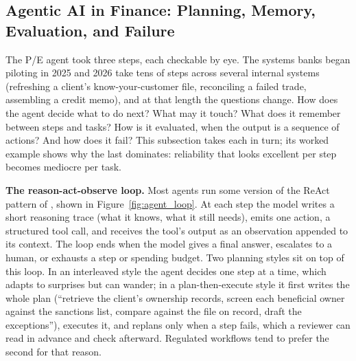 \documentclass[../ai_in_finance]{subfiles}
\begin{document}
\subsection{Agentic AI in Finance: Planning, Memory, Evaluation, and Failure}
\label{sec:agentic-ai}

The P/E agent took three steps, each checkable by eye. The systems banks began piloting in 2025 and 2026 take tens of steps across several internal systems (refreshing a client's know-your-customer file, reconciling a failed trade, assembling a credit memo), and at that length the questions change. How does the agent decide what to do next? What may it touch? What does it remember between steps and tasks? How is it evaluated, when the output is a sequence of actions? And how does it fail? This subsection takes each in turn; its worked example shows why the last dominates: reliability that looks excellent per step becomes mediocre per task.

\textbf{The reason-act-observe loop.} Most agents run some version of the ReAct pattern of \textcite{yao2023react}, shown in Figure~\ref{fig:agent_loop}. At each step the model writes a short reasoning trace (what it knows, what it still needs), emits one action, a structured tool call, and receives the tool's output as an observation appended to its context. The loop ends when the model gives a final answer, escalates to a human, or exhausts a step or spending budget. Two planning styles sit on top of this loop. In an interleaved style the agent decides one step at a time, which adapts to surprises but can wander; in a plan-then-execute style it first writes the whole plan (``retrieve the client's ownership records, screen each beneficial owner against the sanctions list, compare against the file on record, draft the exceptions''), executes it, and replans only when a step fails, which a reviewer can read in advance and check afterward. Regulated workflows tend to prefer the second for that reason.
\end{document}
